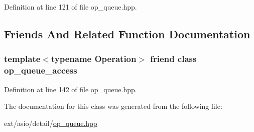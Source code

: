 Definition at line 121 of file op\+\_\+queue.\+hpp.



\subsection{Friends And Related Function Documentation}
\hypertarget{classasio_1_1detail_1_1op__queue_a8e30c53833cb03dcfc31f84f66cd71c7}{}
\subsubsection[{op\+\_\+queue\+\_\+access}]{\setlength{\rightskip}{0pt plus 5cm}template$<$typename Operation$>$ friend class {\bf op\+\_\+queue\+\_\+access}\hspace{0.3cm}{\ttfamily [friend]}}\label{classasio_1_1detail_1_1op__queue_a8e30c53833cb03dcfc31f84f66cd71c7}


Definition at line 142 of file op\+\_\+queue.\+hpp.



The documentation for this class was generated from the following file\+:\begin{DoxyCompactItemize}
\item 
ext/asio/detail/\hyperlink{op__queue_8hpp}{op\+\_\+queue.\+hpp}\end{DoxyCompactItemize}
